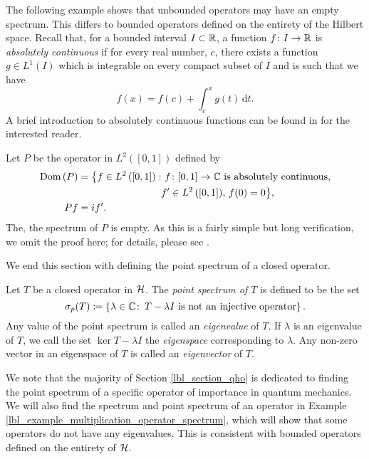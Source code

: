 The following example shows that unbounded operators may have an empty spectrum. This differs to bounded operators defined on the entirety of the Hilbert space. Recall that, for a bounded interval $I \subset \mathbb{R}$, a function $f \colon I \to \mathbb{R}$ is {\emph{absolutely continuous}} if for every real number, $c$, there exists a function $g \in L^1(I)$ which is integrable on every compact subset of $I$ and is such that we have
\begin{equation*}
  f(x) = f(c) + \int_{c}^{x} g(t)\,\mathrm{d}t.
\end{equation*}
A brief introduction to absolutely continuous functions can be found in {\cite[Chapter 2.7]{teschl}} for the interested reader.

\begin{example}
  Let $P$ be the operator in $L^2\left( [0, 1] \right)$ defined by
  \begin{align*}
    \operatorname{Dom}\left(P\right) &= \big\{f \in L^2\left( [0, 1] \right) \colon \text{$f \colon [0,1] \to \mathbb{C}$ is absolutely continuous,}\\ &\qquad\qquad\qquad\qquad\,\, \text{$f' \in L^2\left( [0, 1]\right)$, $f(0) = 0$}\big\}, \\
    P f &= i f'.
  \end{align*}
  The, the spectrum of $P$ is empty. As this is a fairly simple but long verification, we omit the proof here; for details, please see {\cite[Example 5, Chapter VIII]{reed}}.
\end{example}

We end this section with defining the point spectrum of a closed operator.

\begin{definition}
  Let $T$ be a closed operator in $\mathcal{H}$. The {\emph{point spectrum of $T$}} is defined to be the set
  \begin{equation*}
    \sigma_p(T) \coloneqq \left\{\lambda \in \mathbb{C} \colon \,\text{$T - \lambda I$ is not an injective operator}\right\}.
  \end{equation*}
  Any value of the point spectrum is called an {\emph{eigenvalue}} of $T$. If $\lambda$ is an eigenvalue of $T$, we call the set $\ker{T - \lambda I}$ the {\emph{eigenspace}} corresponding to $\lambda$. Any non-zero vector in an eigenspace of $T$ is called an {\emph{eigenvector}} of $T$.
\end{definition}

We note that the majority of Section \eqref{lbl_section_qho} is dedicated to finding the point spectrum of a specific operator of importance in quantum mechanics. We will also find the spectrum and point spectrum of an operator in Example \eqref{lbl_example_multiplication_operator_spectrum}, which will show that some operators do not have any eigenvalues. This is consistent with bounded operators defined on the entirety of $\mathcal{H}$.

